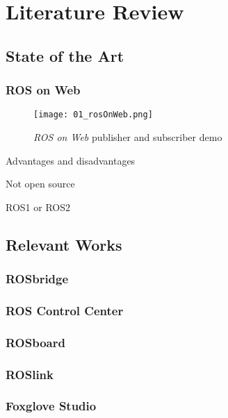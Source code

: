 \chapter{Literature Review}\label{cha:literature}

\section{State of the Art}\label{sec:state}

    \subsection{ROS on Web}\label{sub:ros_on_web}

        \begin{figure}[htbp]
            \centering
            \texttt{[image: 01\_rosOnWeb.png]}
            \caption{\textit{ROS on Web} publisher and subscriber demo}
        \end{figure}

        Advantages and disadvantages

        Not open source

        ROS1 or ROS2


\section{Relevant Works}

    \subsection{ROSbridge}

    \subsection{ROS Control Center}

    \subsection{ROSboard}

    \subsection{ROSlink}

    \subsection{Foxglove Studio}

